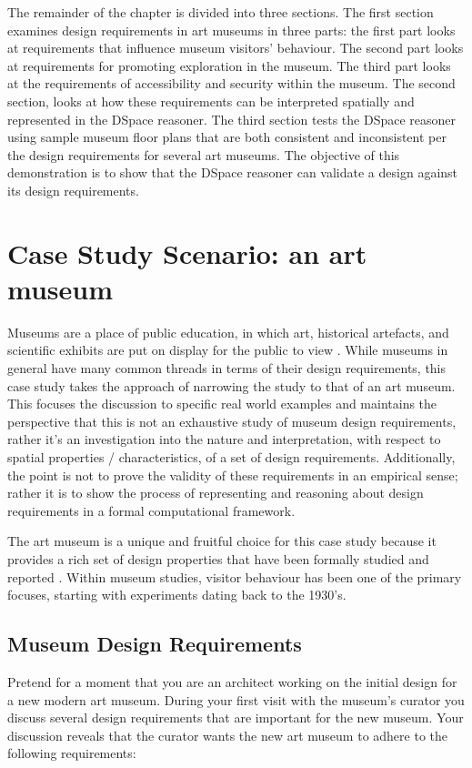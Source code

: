 \documentclass[12pt]{ucthesis}
\begin{document}
The remainder of the chapter is divided into three sections. The first section examines design requirements in art museums in three parts: the first part looks at requirements that influence museum visitors' behaviour. The second part looks at requirements for promoting exploration in the museum. The third part looks at the requirements of accessibility and security within the museum. The second section, looks at how these requirements can be interpreted spatially and represented in the DSpace reasoner. The third section tests the DSpace reasoner using sample museum floor plans that are both consistent and inconsistent per the design requirements for several art museums. The objective of this demonstration is to show that the DSpace reasoner can validate a design against its design requirements.


\section{Case Study Scenario: an art museum}
Museums are a place of public education, in which art, historical artefacts, and scientific exhibits are put on display for the public to view \cite{Falk}. While museums in general have many common threads in terms of their design requirements, this case study takes the approach of narrowing the study to that of an art museum. This focuses the discussion to specific real world examples and maintains the perspective that this is not an exhaustive study of museum design requirements, rather it's an investigation into the nature and interpretation, with respect to spatial properties / characteristics, of a set of design requirements. Additionally, the point is not to prove the validity of these requirements in an empirical sense; rather it is to show the process of representing and reasoning about design requirements in a formal computational framework.

The art museum is a unique and fruitful choice for this case study because it provides a rich set of design properties that have been formally studied and reported \cite{Melton} \cite{Bitgood02} \cite{Falk}. Within museum studies, visitor behaviour has been one of the primary focuses, starting with experiments dating back to the 1930's. 



\subsection{Museum Design Requirements}
Pretend for a moment that you are an architect working on the initial design for a new modern art museum. During your first visit with the museum's curator you discuss several design requirements that are important for the new museum. Your discussion reveals that the curator wants the new art museum to adhere to the following requirements:
\end{document}
